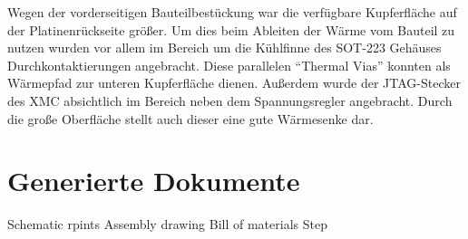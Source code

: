 Wegen der vorderseitigen Bauteilbestückung war die verfügbare Kupferfläche auf der Platinenrückseite  größer. Um dies beim Ableiten der Wärme vom Bauteil zu nutzen wurden vor allem im Bereich um die Kühlfinne des \ac{SOT}-223 Gehäuses Durchkontaktierungen angebracht. Diese parallelen \enquote{Thermal Vias} konnten als Wärmepfad zur unteren Kupferfläche dienen. Außerdem wurde der \ac{JTAG}-Stecker des XMC absichtlich im Bereich neben dem Spannungsregler angebracht. Durch die große Oberfläche stellt auch dieser eine gute Wärmesenke dar. %

\section{Generierte Dokumente}

Schematic rpints
Assembly drawing
Bill of materials
Step
